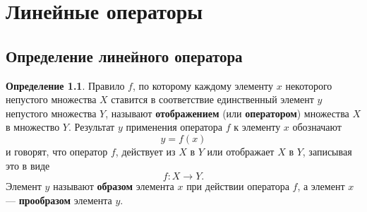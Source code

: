 \documentclass[a5paper, 11pt]{extbook}
\theoremstyle{definition}
\theoremstyle{definition}
\newtheorem{definition}{Определение}[section]
\theoremstyle{definition}
\begin{document}






\chapter{Линейные операторы}

\section{Определение линейного оператора}

\begin{definition}
    Правило \(f\), по которому каждому элементу \(x\) некоторого непустого множества \(X\) ставится в соответствие единственный элемент \(y\) непустого множества \(Y\), называют \textbf{отображением} (или \textbf{оператором}) множества \(X\) в множество \(Y\). Результат \(y\) применения оператора \(f\) к элементу \(x\) обозначают
    \[
        y = f(x)
    \]
    и говорят, что оператор \(f\), действует из \(X\) в \(Y\) или отображает \(X\) в \(Y\), записывая это в виде
    \[
        f: X \to Y.
    \]
    Элемент \(y\) называют \textbf{образом} элемента \(x\) при действии оператора \(f\), а элемент \(x\) — \textbf{прообразом} элемента \(y\).
\end{definition}
\end{document}
